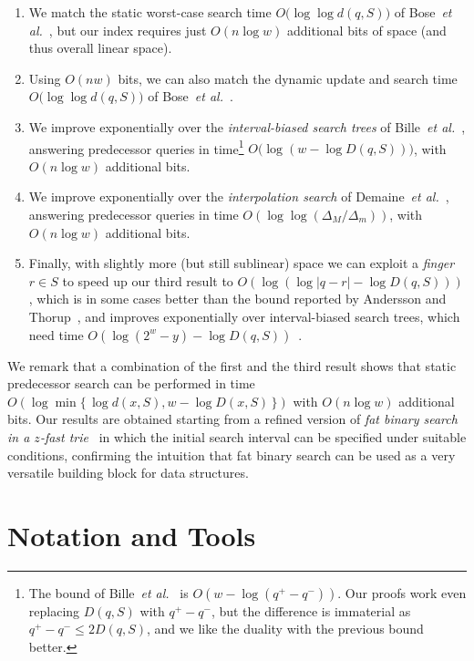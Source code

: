 \documentclass[a4paper,11pt]{article}
\newcommand{\etal}{\emph{et al.}\xspace}
\newcommand{\?}{\mskip1.5mu}
\begin{document}
\begin{enumerate}
  \item We match the static worst-case search time 
  $O\big(\log\log d(q, S)\big)$
  of Bose~\etal~\cite{BoseDoDuHoMo13}, but our index requires 
  just $O(n\log w)$ additional bits of space (and thus overall 
  linear space).
  \item Using $O(nw)$ bits, we can also match the dynamic
  update and search time $O\big(\log\log d(q, S)\big)$
  of Bose~\etal~\cite{BoseDoDuHoMo13}.
  \item We improve exponentially over the \emph{interval-biased search
  trees} of Bille~\etal~\cite{BilleLaRaSaSaWe15}, answering 
  predecessor queries in time\footnote{The
  bound of Bille~\etal~\cite{BilleLaRaSaSaWe15} is 
  $O(w - \log(q^+ - q^-))$. Our 
  proofs work even replacing $D(q, S)$ with $q^+ - q^-$, but 
  the difference is immaterial as $q^+ - q^-\leq 2D(q, S)$, and 
  we like the duality with the previous bound better.} 
  $O\big(\log(w - \log D(q, S))\big)$, with 
  $O(n\log w)$ additional bits.
  \item We improve exponentially over the \emph{interpolation
  search} of Demaine~\etal~\cite{DemaineJoPa04}, answering
  predecessor queries in time 
  $O\left(\log\log(\Delta_M / \Delta_m)\right)$, with
  $O(n\log w)$ additional bits.
  \item Finally, with slightly more (but still sublinear) space 
  we can exploit a \emph{finger} $r \in S$ to speed up our third 
  result to $O\left(\log(\log|q - r| - \log D(q, S))\right)$, which is in
  some cases better than the bound reported
  by Andersson and Thorup~\cite{AnderssonTh07}, and improves 
  exponentially over interval-biased search trees, which need 
  time  
  $O\left(\log(2^w - y) - \log D(q, S)\right)$~\cite{BilleLaRaSaSaWe15}.
\end{enumerate}
We remark that a combination of the first
and the third result shows that static predecessor 
search can be performed in time  
$O\left(\log \min \{\,\log d(x,S),w-\log D(x,S)\,\}\right)$ 
with $O(n \log w)$ additional bits. Our 
results are obtained starting from a refined version of
\emph{fat binary search in a $z$-fast trie}~\cite{BelazzouguiBoPaVi09} 
in which the initial search interval can be specified under 
suitable conditions, confirming the intuition that fat
binary search can be used as a very versatile building block 
for data structures.

\section{Notation and Tools}
\label{sec:notation}
\end{document}
